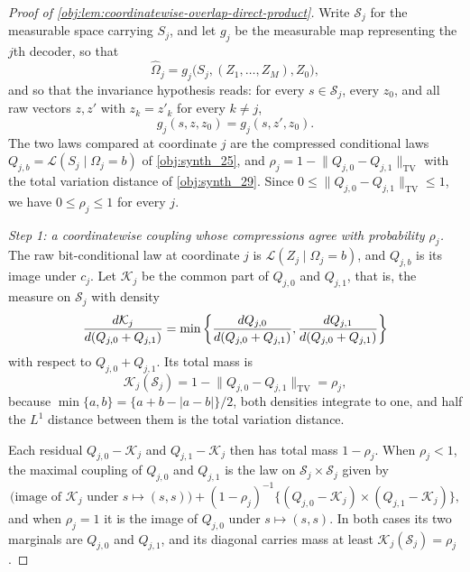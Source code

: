 \documentclass[11pt]{article}
\begin{document}
\begin{proof}[Proof of \cref{obj:lem:coordinatewise-overlap-direct-product}]
Write \(\mathcal S_j\) for the measurable space carrying \(S_j\), and let \(g_j\) be the measurable map representing the \(j\)th decoder, so that
\[
\widehat\Omega_j=g_j\bigl(S_j,(Z_1,\ldots,Z_M),Z_0\bigr),
\]
and so that the invariance hypothesis reads: for every \(s\in\mathcal S_j\), every \(z_0\), and all raw vectors \(z,z'\) with \(z_k=z'_k\) for every \(k\neq j\),
\[
g_j(s,z,z_0)=g_j(s,z',z_0).
\]
The two laws compared at coordinate \(j\) are the compressed conditional laws \(Q_{j,b}=\mathcal L(S_j\mid\Omega_j=b)\) of \cref{obj:synth_25}, and \(\rho_j=1-\lVert Q_{j,0}-Q_{j,1}\rVert_{\mathrm{TV}}\) with the total variation distance of \cref{obj:synth_29}. Since \(0\leq\lVert Q_{j,0}-Q_{j,1}\rVert_{\mathrm{TV}}\leq1\), we have \(0\leq\rho_j\leq1\) for every \(j\).

\emph{Step 1: a coordinatewise coupling whose compressions agree with probability \(\rho_j\).}
The raw bit-conditional law at coordinate \(j\) is \(\mathcal L(Z_j\mid\Omega_j=b)\), and \(Q_{j,b}\) is its image under \(c_j\). Let \(\mathcal K_j\) be the common part of \(Q_{j,0}\) and \(Q_{j,1}\), that is, the measure on \(\mathcal S_j\) with density
\[
{d\mathcal K_j\over d(Q_{j,0}+Q_{j,1})}
=
\min\left\{
{dQ_{j,0}\over d(Q_{j,0}+Q_{j,1})},
{dQ_{j,1}\over d(Q_{j,0}+Q_{j,1})}
\right\}
\]
with respect to \(Q_{j,0}+Q_{j,1}\). Its total mass is
\[
\mathcal K_j(\mathcal S_j)=1-\lVert Q_{j,0}-Q_{j,1}\rVert_{\mathrm{TV}}=\rho_j,
\]
because \(\min\{a,b\}=\{a+b-|a-b|\}/2\), both densities integrate to one, and half the \(L^1\) distance between them is the total variation distance.

Each residual \(Q_{j,0}-\mathcal K_j\) and \(Q_{j,1}-\mathcal K_j\) then has total mass \(1-\rho_j\). When \(\rho_j<1\), the maximal coupling of \(Q_{j,0}\) and \(Q_{j,1}\) is the law on \(\mathcal S_j\times\mathcal S_j\) given by
\[
\bigl(\text{image of }\mathcal K_j\text{ under }s\mapsto(s,s)\bigr)
+
(1-\rho_j)^{-1}\bigl\{(Q_{j,0}-\mathcal K_j)\times(Q_{j,1}-\mathcal K_j)\bigr\},
\]
and when \(\rho_j=1\) it is the image of \(Q_{j,0}\) under \(s\mapsto(s,s)\). In both cases its two marginals are \(Q_{j,0}\) and \(Q_{j,1}\), and its diagonal carries mass at least \(\mathcal K_j(\mathcal S_j)=\rho_j\).


\end{proof}
\end{document}
